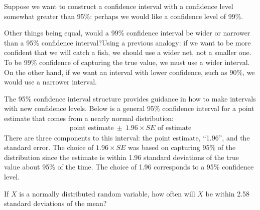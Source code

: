 
Suppose we want to construct a confidence interval with a confidence level somewhat greater than 95\%: perhaps we would like a confidence level of 99\%. 

\begin{examplewrap}
\begin{nexample}{Other things being equal, would a 99\% confidence interval be wider or narrower than a 95\% confidence interval?}Using a previous analogy: if we want to be more confident that we will catch a fish, we should use a wider net, not a smaller one. To be 99\% confidence of capturing the true value, we must use a wider interval. On the other hand, if we want an interval with lower confidence, such as 90\%, we would use a narrower interval.
\end{nexample}
\end{examplewrap}

The 95\% confidence interval structure provides guidance in how to make intervals with new confidence levels. Below is a general 95\% confidence interval for a point estimate that comes from a nearly normal distribution:
\begin{eqnarray}
\text{point estimate}\ \pm\ 1.96\times SE \text{ of estimate}
\end{eqnarray}
There are three components to this interval: the point estimate, ``1.96'', and the standard error. The choice of $1.96\times SE$ was based on capturing 95\% of the distribution since the estimate is within 1.96 standard deviations of the true value about 95\% of the time. The choice of 1.96 corresponds to a 95\% confidence level. 

\begin{exercisewrap}
\begin{nexercise} \label{leadInForMakingA99PercentCIExercise}
If $X$ is a normally distributed random variable, how often will $X$ be within 2.58 standard deviations of the mean?\footnotemark
\end{nexercise}
\end{exercisewrap}


